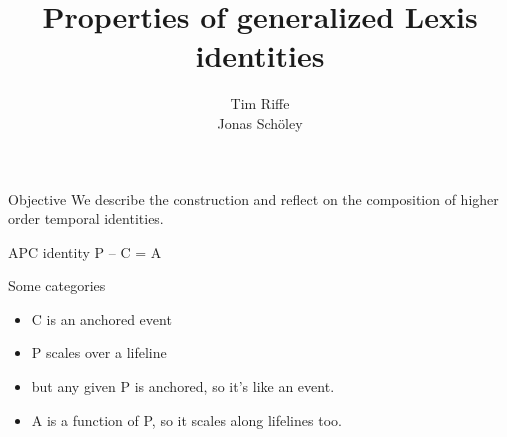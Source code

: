 \documentclass[20pt]{beamer}
\title{Properties of generalized Lexis identities}
\subtitle{Tim Riffe \\ Jonas Sch{\"o}ley}		%
\begin{document}

\begin{frame}
	\titlepage
\end{frame}
\begin{frame}[plain]
\begin{block}{Objective}
We describe the construction and reflect on the composition of higher order
temporal identities.
\end{block}

\end{frame}


\begin{frame}[plain]
\end{frame}


\begin{frame}[plain]
\end{frame}


\begin{frame}[plain]
\begin{block}{APC identity}
P -- C = A
\end{block}
\end{frame}


\begin{frame}[plain]
\begin{center}
\end{center}
\end{frame}


\begin{frame}[plain]
\begin{center}
\Large Some categories
\begin{itemize}[<+->]
  \item C is an anchored event
  \item P scales over a lifeline
  \item but any given P is anchored, so it's like an event.
  \item A is a function of P, so it scales along lifelines too.
\end{itemize}
\end{center}
\end{frame}
\end{document}

